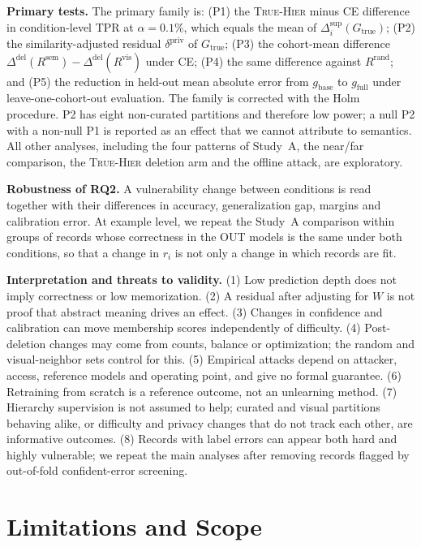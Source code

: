 \documentclass{article} %
\newcommand{\cn}[1]{\textsc{#1}}
\newcommand{\Gtrue}{G_{\mathrm{true}}}
\begin{document}
\textbf{Primary tests.} The primary family is: (P1) the \cn{True-Hier} minus \cn{CE} difference in condition-level TPR at $\alpha=0.1\%$, which equals the mean of $\Delta_i^{\mathrm{sup}}(\Gtrue)$; (P2) the similarity-adjusted residual $\delta^{\mathrm{priv}}$ of $\Gtrue$; (P3) the cohort-mean difference $\Delta^{\mathrm{del}}(R^{\mathrm{sem}})-\Delta^{\mathrm{del}}(R^{\mathrm{vis}})$ under \cn{CE}; (P4) the same difference against $R^{\mathrm{rand}}$; and (P5) the reduction in held-out mean absolute error from $g_{\mathrm{base}}$ to $g_{\mathrm{full}}$ under leave-one-cohort-out evaluation. The family is corrected with the Holm procedure. P2 has eight non-curated partitions and therefore low power; a null P2 with a non-null P1 is reported as an effect that we cannot attribute to semantics. All other analyses, including the four patterns of Study~A, the near/far comparison, the \cn{True-Hier} deletion arm and the offline attack, are exploratory.

\textbf{Robustness of RQ2.} A vulnerability change between conditions is read together with their differences in accuracy, generalization gap, margins and calibration error. At example level, we repeat the Study~A comparison within groups of records whose correctness in the OUT models is the same under both conditions, so that a change in $r_i$ is not only a change in which records are fit.

\textbf{Interpretation and threats to validity.} (1) Low prediction depth does not imply correctness or low memorization. (2) A residual after adjusting for $W$ is not proof that abstract meaning drives an effect. (3) Changes in confidence and calibration can move membership scores independently of difficulty. (4) Post-deletion changes may come from counts, balance or optimization; the random and visual-neighbor sets control for this. (5) Empirical attacks depend on attacker, access, reference models and operating point, and give no formal guarantee. (6) Retraining from scratch is a reference outcome, not an unlearning method. (7) Hierarchy supervision is not assumed to help; curated and visual partitions behaving alike, or difficulty and privacy changes that do not track each other, are informative outcomes. (8) Records with label errors \citep{northcutt2021labelerrors} can appear both hard and highly vulnerable; we repeat the main analyses after removing records flagged by out-of-fold confident-error screening.

\section{Limitations and Scope}
\label{sec:limits}
\end{document}
